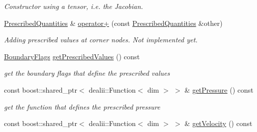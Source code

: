 \begin{DoxyCompactItemize}
\begin{DoxyCompactList}\small\item\em Constructor using a tensor, i.e. the Jacobian. \item\end{DoxyCompactList}\item 
\hypertarget{classnatrium_1_1PrescribedQuantities_a9478b4ef666ed7e180063cc103abbe35}{
\hyperlink{classnatrium_1_1PrescribedQuantities}{PrescribedQuantities} \& \hyperlink{classnatrium_1_1PrescribedQuantities_a9478b4ef666ed7e180063cc103abbe35}{operator+} (const \hyperlink{classnatrium_1_1PrescribedQuantities}{PrescribedQuantities} \&other)}
\label{classnatrium_1_1PrescribedQuantities_a9478b4ef666ed7e180063cc103abbe35}

\begin{DoxyCompactList}\small\item\em Adding prescribed values at corner nodes. Not implemented yet. \item\end{DoxyCompactList}\item 
\hypertarget{classnatrium_1_1PrescribedQuantities_abd0a9118245c390be9a3f25c69264646}{
\hyperlink{namespacenatrium_a93b2a3d564675413b9f6cc88c60f46af}{BoundaryFlags} \hyperlink{classnatrium_1_1PrescribedQuantities_abd0a9118245c390be9a3f25c69264646}{getPrescribedValues} () const }
\label{classnatrium_1_1PrescribedQuantities_abd0a9118245c390be9a3f25c69264646}

\begin{DoxyCompactList}\small\item\em get the boundary flags that define the prescribed values \item\end{DoxyCompactList}\item 
\hypertarget{classnatrium_1_1PrescribedQuantities_a00fa3456952323fb1b0d4844ce626aee}{
const boost::shared\_\-ptr$<$ dealii::Function$<$ dim $>$ $>$ \& \hyperlink{classnatrium_1_1PrescribedQuantities_a00fa3456952323fb1b0d4844ce626aee}{getPressure} () const }
\label{classnatrium_1_1PrescribedQuantities_a00fa3456952323fb1b0d4844ce626aee}

\begin{DoxyCompactList}\small\item\em get the function that defines the prescribed pressure \item\end{DoxyCompactList}\item 
\hypertarget{classnatrium_1_1PrescribedQuantities_a0fd5bdca3f77f3d946b5453d7c989ba3}{
const boost::shared\_\-ptr$<$ dealii::Function$<$ dim $>$ $>$ \& \hyperlink{classnatrium_1_1PrescribedQuantities_a0fd5bdca3f77f3d946b5453d7c989ba3}{getVelocity} () const }
\label{classnatrium_1_1PrescribedQuantities_a0fd5bdca3f77f3d946b5453d7c989ba3}


\end{DoxyCompactItemize}
